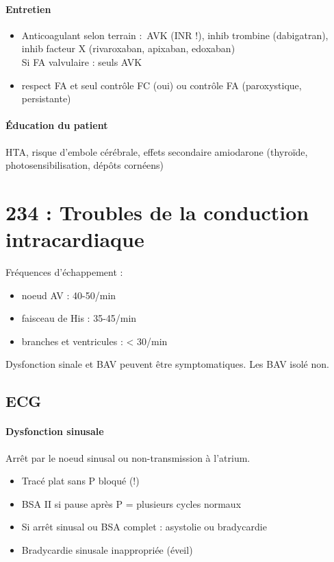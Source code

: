 \documentclass{article}
\begin{document}
\paragraph{Entretien}
\begin{itemize}
  \item Anticoagulant selon terrain : AVK (INR !), inhib trombine (dabigatran), inhib
facteur X (rivaroxaban, apixaban, edoxaban)\\
Si FA valvulaire : seuls AVK
\item respect FA et seul contrôle FC (oui) ou contrôle FA (paroxystique,
  persistante)
\end{itemize}

\paragraph{Éducation du patient}
HTA, risque d'embole cérébrale, effets secondaire amiodarone (thyroïde,
photosensibilisation, dépôts cornéens)

\section{234 : Troubles de la conduction intracardiaque}%
\label{sec:234_troubles_de_la_conduction_intracardiaque}
Fréquences d'échappement :
\begin{itemize}
  \item noeud AV : 40-50/min
  \item faisceau de His : 35-45/min
  \item branches et ventricules : < 30/min
\end{itemize}
Dysfonction sinale et BAV peuvent être symptomatiques. Les BAV isolé non.

\subsection{ECG}%
\paragraph{Dysfonction sinusale}
Arrêt par le noeud sinusal ou non-transmission à l'atrium.

\begin{itemize}
  \item Tracé plat sans P bloqué (!)
  \item BSA II si pause après P = plusieurs cycles normaux
  \item Si arrêt sinusal ou BSA complet : asystolie ou bradycardie
  \item Bradycardie sinusale inappropriée (éveil)
\end{itemize}
\end{document}
